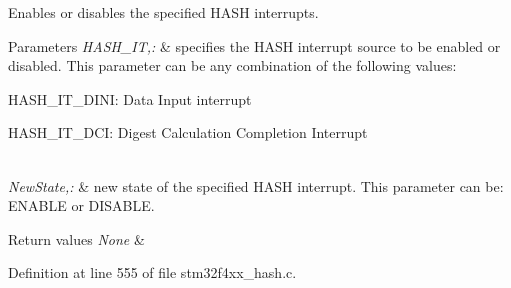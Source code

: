 Enables or disables the specified H\-A\-S\-H interrupts. 


\begin{DoxyParams}{Parameters}
{\em H\-A\-S\-H\-\_\-\-I\-T,\-:} & specifies the H\-A\-S\-H interrupt source to be enabled or disabled. This parameter can be any combination of the following values\-: \begin{DoxyItemize}
\item H\-A\-S\-H\-\_\-\-I\-T\-\_\-\-D\-I\-N\-I\-: Data Input interrupt \item H\-A\-S\-H\-\_\-\-I\-T\-\_\-\-D\-C\-I\-: Digest Calculation Completion Interrupt \end{DoxyItemize}
\\
\hline
{\em New\-State,\-:} & new state of the specified H\-A\-S\-H interrupt. This parameter can be\-: E\-N\-A\-B\-L\-E or D\-I\-S\-A\-B\-L\-E. \\
\hline
\end{DoxyParams}

\begin{DoxyRetVals}{Return values}
{\em None} & \\
\hline
\end{DoxyRetVals}


Definition at line 555 of file stm32f4xx\-\_\-hash.\-c.

